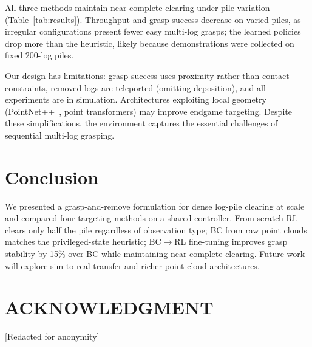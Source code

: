 \documentclass[conference]{IEEEtran}
\begin{document}
All three methods maintain near-complete clearing under pile variation (Table~\ref{tab:results}). Throughput and grasp success decrease on varied piles, as irregular configurations present fewer easy multi-log grasps; the learned policies drop more than the heuristic, likely because demonstrations were collected on fixed 200-log piles.

Our design has limitations: grasp success uses proximity rather than contact constraints, removed logs are teleported (omitting deposition), and all experiments are in simulation. Architectures exploiting local geometry (PointNet++~\cite{qi2017pointnetplusplus}, point transformers) may improve endgame targeting. Despite these simplifications, the environment captures the essential challenges of sequential multi-log grasping.

\section{Conclusion}
We presented a grasp-and-remove formulation for dense log-pile clearing at scale and compared four targeting methods on a shared controller.
From-scratch RL clears only half the pile regardless of observation type; BC from raw point clouds matches the privileged-state heuristic; BC$\to$RL fine-tuning improves grasp stability by 15\% over BC while maintaining near-complete clearing.
Future work will explore sim-to-real transfer and richer point cloud architectures.

\section*{ACKNOWLEDGMENT}
[Redacted for anonymity]



\end{document}
